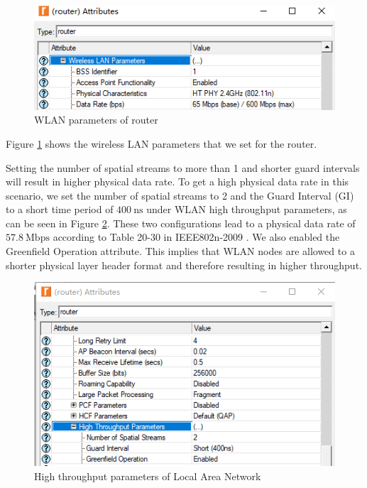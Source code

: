 \begin{figure}[H]
	\centering
	\includegraphics[scale=0.54]{Figures/amantianrenamed/ScenariooneWirelessLanParametersofrouter.png}
	\caption[Wireless LAN parameters of router]{\gls{WLAN} parameters of router}
	\label{fig:1:wlan:para}
\end{figure}

Figure \ref{fig:1:wlan:para} shows the wireless LAN parameters that we set for the router. 

Setting the number of spatial streams to more than 1 and shorter guard intervals will result in higher physical data rate. To get a high physical data rate in this scenario, we set the number of spatial streams to 2 and the Guard Interval (GI) to a short time period of $400~\mathrm{ns}$ under \gls{WLAN} high throughput parameters, as can be seen in Figure \ref{fig:1:wlan:hi}. These two configurations lead to a physical data rate of $57.8~\mathrm{Mbps}$ according to Table 20-30 in \gls{IEEE802}n-2009 \cite{ieee80211n}. We also enabled the Greenfield Operation attribute. This implies that \gls{WLAN} nodes are allowed to a shorter physical layer header format and therefore resulting in higher throughput.

\begin{figure}[H]
	\centering
	\includegraphics[scale=0.59]{Figures/amantianrenamed/ScenariooneHighThroughputParametersoflocalareanetwork.png}
	\caption{High throughput parameters of Local Area Network}
	\label{fig:1:wlan:hi}
\end{figure}



